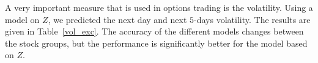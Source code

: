 \documentclass[10pt,twocolumn,letterpaper]{article}
\begin{document}
  

A very important measure that is used in options trading is the volatility. Using a model on $Z$, we predicted the next day and next $5$-days volatility. The results are given in Table~\ref{vol_exc}. The accuracy of the different models changes between the stock groups, but the performance is significantly better for the model based on $Z$. 
\end{document}
